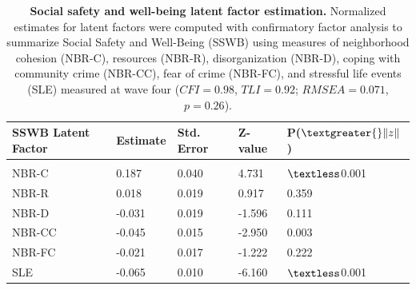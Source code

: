 \documentclass[utf8]{article}
\begin{document}
\begin{table}[h!]
\begin{tabular}{lllll}
SSWB Latent Factor & Estimate & Std. Error & Z-value & P($\textgreater{}\|z\|$) \\ \hline
                   &          &            &         &                          \\
NBR-C              & 0.187    & 0.040      & 4.731   & $\textless$0.001                    \\                   
NBR-R              & 0.018    & 0.019      & 0.917   & 0.359                    \\
NBR-D              & -0.031   & 0.019      & -1.596  & 0.111                    \\
NBR-CC             & -0.045   & 0.015      & -2.950  & 0.003                    \\
NBR-FC             & -0.021   & 0.017      & -1.222  & 0.222                    \\
SLE                & -0.065   & 0.010      & -6.160  & $\textless$0.001                   
\end{tabular}
\caption{\textbf{Social safety and well-being latent factor estimation.} Normalized estimates for latent factors were computed with confirmatory factor analysis to summarize Social Safety and Well-Being (SSWB) using measures of neighborhood cohesion (NBR-C), resources (NBR-R), disorganization (NBR-D), coping with community crime (NBR-CC),  fear of crime (NBR-FC), and stressful life events (SLE) measured at wave four ($CFI=0.98$, $TLI=0.92$; $RMSEA=0.071$, $p=0.26$).\label{tab:7}}
\end{table}
\end{document}
